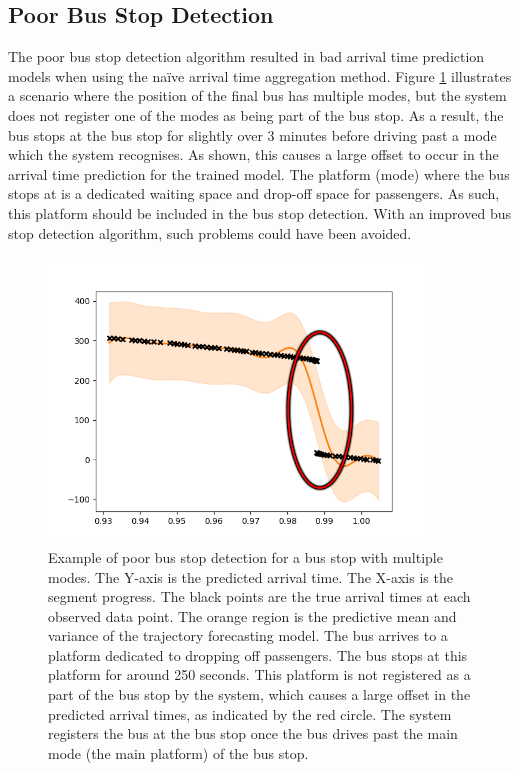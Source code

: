 \subsection{Poor Bus Stop Detection}
The poor bus stop detection algorithm resulted in bad arrival time prediction models when using the naïve arrival time aggregation method.
Figure \ref{fig:bad-gp-rese-c} illustrates a scenario where the position of the final bus has multiple modes, but the system does not register one of the modes as being part of the bus stop.
As a result, the bus stops at the bus stop for slightly over 3 minutes before driving past a mode which the system recognises.
As shown, this causes a large offset to occur in the arrival time prediction for the trained model.
The platform (mode) where the bus stops at is a dedicated waiting space and drop-off space for passengers.
As such, this platform should be included in the bus stop detection.
With an improved bus stop detection algorithm, such problems could have been avoided.

\begin{figure}[t]
    \centering
    \includegraphics[width=0.9\textwidth]{figures/forecasting/bad_gp_rese_centrum}
    \caption[Example of poor bus stop detection for a bus stop with multiple modes]%
    {\small Example of poor bus stop detection for a bus stop with multiple modes.
    The Y-axis is the predicted arrival time.
    The X-axis is the segment progress.
    The black points are the true arrival times at each observed data point.
    The orange region is the predictive mean and variance of the trajectory forecasting model.
    The bus arrives to a platform dedicated to dropping off passengers.
    The bus stops at this platform for around 250 seconds.
    This platform is not registered as a part of the bus stop by the system, which causes a large offset in the predicted arrival times, as indicated by the red circle.
    The system registers the bus at the bus stop once the bus drives past the main mode (the main platform) of the bus stop.
    }
    \label{fig:bad-gp-rese-c}
\end{figure}

